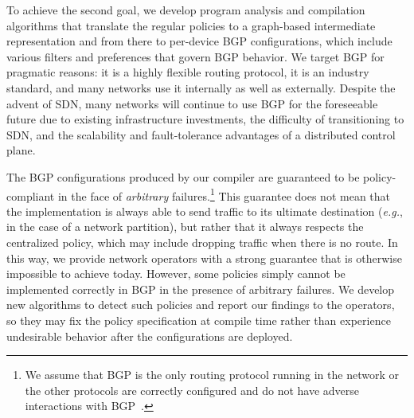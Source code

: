 \documentclass[10pt]{sigalternate052015}
\newcommand{\EG}{\emph{e.g.}}
\begin{document}

To achieve the second goal, we develop program analysis and compilation
algorithms that translate the regular policies to a graph-based
intermediate representation and from there to per-device BGP configurations, which include various filters and preferences that govern BGP behavior.
We target BGP for pragmatic reasons:
it is a highly flexible routing protocol,
it is an industry standard,
and many networks use it internally as well as externally.
Despite the advent of SDN, many networks will continue to
use BGP for the foreseeable future due to existing infrastructure investments, the difficulty of transitioning to SDN, and the scalability and fault-tolerance advantages of a distributed
control plane.

The BGP configurations produced by our compiler are
guaranteed to be policy-compliant in the face of
{\em arbitrary} failures.\footnote{We assume that BGP is the only routing protocol running in the network or the other protocols are correctly configured and do not have adverse interactions with BGP~\cite{igp-correctness1,igp-correctness2}.} This guarantee does not mean that the implementation is always
able to send traffic to its ultimate destination
(\EG, in the case of a network partition), but rather that it always respects the
centralized policy, which may include dropping traffic when there is no route.
%
In this way, we provide network operators
with a strong guarantee that is otherwise impossible to achieve
today.
However, some policies simply cannot be implemented correctly in BGP in
 the presence of arbitrary failures.  We develop new
algorithms to detect such policies
and report our findings to the operators, so they may fix the policy
specification at compile time rather than experience undesirable
behavior after the configurations are deployed.

\end{document}
